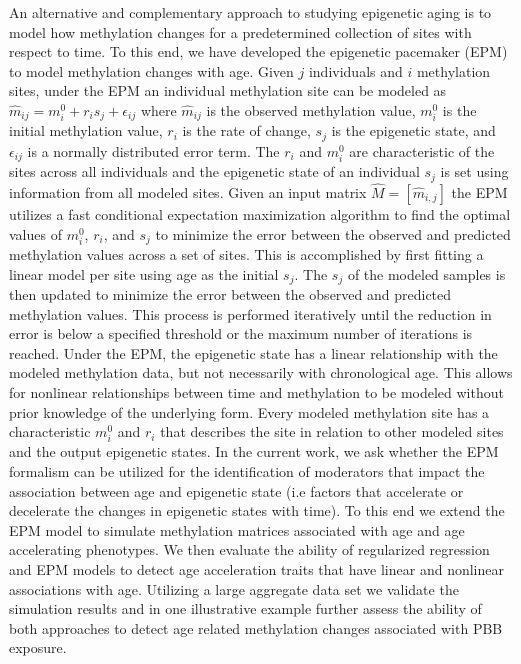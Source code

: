 \documentclass{article}
\begin{document}
{{\begin{linenumbers}
An alternative and complementary approach to studying epigenetic aging is to model how methylation changes for a 
predetermined collection of sites with respect to time. To this end, we have developed the epigenetic pacemaker 
(EPM) \cite{Snir2016-dv,Farrell2020-ri} to model methylation changes with age. Given $j$ individuals and $i$ 
methylation sites, under the EPM an individual methylation site can be modeled as 
$\hat{m}_{ij} = m^0_i + r_is_j + \epsilon _{ij}$ where $\hat{m}_{ij}$ is the observed methylation value, 
$m^0_i$ is the initial methylation value, $r_i$ is the rate of change, $s_j$ is the epigenetic state, and 
$\epsilon _{ij}$ is a normally distributed error term. The $r_i$ and $m^0_i$ are characteristic of the sites 
across all individuals and the epigenetic state of an individual $s_j$ is set using information from all modeled 
sites. Given an input matrix $\hat M=[\hat  m_{i,j}]$ the EPM utilizes a fast conditional expectation maximization 
algorithm to find the optimal values of $m^0_i$, $r_i$, and $s_j$ to minimize the error between the observed 
and predicted methylation values across a set of sites. This is accomplished by first fitting a linear model 
per site using age as the initial $s_j$. The $s_j$ of the modeled samples is then updated to minimize the error 
between the observed and predicted methylation values. This process is performed iteratively until the reduction 
in error is below a specified threshold or the maximum number of iterations is reached. Under the EPM, the epigenetic 
state has a linear relationship with the modeled methylation data, but not necessarily with chronological age. This 
allows for nonlinear relationships between time and methylation to be modeled without prior knowledge of the underlying 
form. Every modeled methylation site has a characteristic $m^0_i$ and $r_i$ that describes the site in relation to 
other modeled sites and the output epigenetic states. In the current work, we ask whether the EPM formalism can be 
utilized for the identification of moderators that impact the association between age and epigenetic state 
(i.e factors that accelerate or decelerate the changes in epigenetic states with time).  To this end we extend the 
EPM model to simulate methylation matrices associated with age and age accelerating phenotypes. We then evaluate the 
ability of regularized regression and EPM models to detect age acceleration traits that have linear and nonlinear 
associations with age.  Utilizing a large aggregate data set we validate the simulation results and in one 
illustrative example further assess the ability of both approaches to detect age related methylation 
changes associated with PBB exposure.


\end{linenumbers}}}
\end{document}
